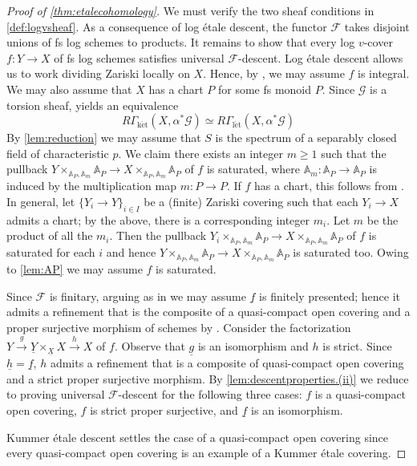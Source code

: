 \documentclass[10pt]{amsart}
\newcommand{\A}{\mathbb{A}}
\newcommand{\cF}{\mathcal{F}}
\newcommand{\cG}{\mathcal{G}}
\newcommand{\ul}{\underline}
\newcommand{\ket}{\mathrm{k\acute{e}t}}
\newcommand{\letale}{\mathrm{l\acute{e}t}}
\begin{document}
\begin{proof}[Proof of \cref{thm:etalecohomology}]
We must verify the two sheaf conditions in \cref{def:logvsheaf}.
As a consequence of log \'etale descent,
the functor $\cF$ takes disjoint unions of fs log schemes to products. 
It remains to show that every log $v$-cover $f \colon Y \to X$ 
of fs log schemes satisfies universal $\cF$-descent.
Log \'etale descent allows us to work dividing Zariski locally on $X$.
Hence, 
by \cite[Theorem 1.1]{integrallogblowup}, 
we may assume $f$ is integral.
We may also assume that $X$ has a chart $P$ for some fs monoid $P$.
Since $\cG$ is a torsion sheaf, \cite[Proposition 5.4 (2)]{MR3658728} yields an equivalence
\[
R\Gamma_\ket(X,\alpha^*\cG)
\simeq
R\Gamma_\letale(X,\alpha^*\cG)
\]
By \cref{lem:reduction} we may assume that $S$ is the spectrum of a separably closed field 
of characteristic $p$.
We claim there exists an integer $m\geq 1$ such that the pullback 
$Y\times_{\A_P,\A_m} \A_P\to X\times_{\A_P,\A_m} \A_P$ of $f$ is saturated,
where $\A_m\colon \A_P\to \A_P$ is induced by the multiplication map $m\colon P\to P$.
If $f$ has a chart, this follows from \cite[Theorem I.4.9.1]{Ogu}. 
In general,
let $\{Y_i\to Y\}_{i\in I}$ be a (finite) Zariski covering such that each $Y_i\to X$ admits a chart; by the above, there is a 
corresponding integer $m_i$.
Let $m$ be the product of all the $m_i$.
Then the pullback $Y_i\times_{\A_P,\A_m} \A_P\to X\times_{\A_P,\A_m} \A_P$ of $f$ is saturated for each $i$ and hence $Y\times_{\A_P,\A_m} \A_P\to X\times_{\A_P,\A_m} \A_P$ is saturated too.
Owing to \cref{lem:AP} we may assume $f$ is saturated.

Since $\cF$ is finitary, 
arguing as in \cite[Proof of Proposition 5.2]{MR4278670} we may assume $\ul{f}$ is finitely presented; hence it admits a refinement that is the composite of a
quasi-compact open covering and a proper surjective morphism of schemes by \cite[Theorem 3.12]{Rydh}.
Consider the factorization $Y\xrightarrow{g} \ul{Y}\times_{\ul{X}}X\xrightarrow{h} X$ of $f$.
Observe that $\ul{g}$ is an isomorphism and $h$ is strict.
Since $\ul{h}=\ul{f}$, $h$ admits a refinement that is a composite of quasi-compact open covering and a strict proper surjective morphism.
By \ref{lem:descentproperties.(ii)}
we reduce to proving universal $\cF$-descent for the following three cases: 
$f$ is a quasi-compact open covering, 
$f$ is strict proper surjective, 
and $\ul{f}$ is an isomorphism.


Kummer \'etale descent settles the case of a quasi-compact open covering
since every quasi-compact open covering is an example of a Kummer \'etale covering.


\end{proof}
\end{document}
